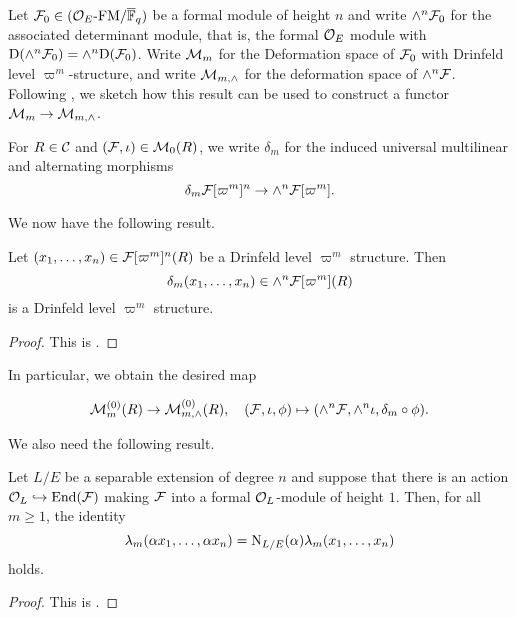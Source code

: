\documentclass[../main.tex]{subfiles}
\begin{document}
Let $\mathcal{F}_0 \in {({\mathcal{O}_E}\text-\allowbreak\mathrm{FM}/{{\overline{\mathbb{F}}_q}})}$ be a formal module of height $n$ and 
write $\wedge^n\mathcal{F}_0$ for the associated determinant module, that is, the 
formal $\mathcal{O}_E$ module with $\mathrm{D}(\wedge^n\mathcal{F}_0) = \wedge^n\mathrm{D}(\mathcal{F}_0)$. Write
$\mathcal{M}_m$ for the Deformation space of $\mathcal{F}_0$ with Drinfeld level
$\varpi^m$-structure, and write $\mathcal{M}_{m, \wedge}$ for the deformation space of
$\wedge^n\mathcal{F}$. 
Following \cite{weinstein2016semistable}, we sketch how this result can be
used to construct a functor $\mathcal{M}_{m} \to \mathcal{M}_{m, \wedge}$. 

For $R\in\mathcal{C}$ and $(\mathcal{F}, \iota) \in \mathcal{M}_{0}(R)$, we write $\delta_m$ for the
induced universal multilinear and alternating morphisms
\begin{equation*}
  \delta_m \mathcal{F}[\varpi^m]^n \to \wedge^n\mathcal{F}[\varpi^m].
\end{equation*}

We now have the following result.

\begin{lem}\label{lem:DeterminantOfDrinfeldStructure}
  Let $(x_1, \dots, x_n) \in \mathcal{F}[\varpi^{m}]^n(R)$ be a Drinfeld level
  $\varpi^m$ structure. Then 
  \begin{equation*}
    \delta_m(x_1, \dots, x_n) \in \wedge^n\mathcal{F}[\varpi^m](R) 
  \end{equation*}
  is a Drinfeld level $\varpi^m$ structure.
\begin{proof}
  This is \cite[Proposition 2.11]{weinstein2016semistable}.
\end{proof}
\end{lem}

In particular, we obtain the desired map

\begin{equation*}
  \mathcal{M}_m^{(0)}(R) \to \mathcal{M}^{(0)}_{m, \wedge}(R), \quad (\mathcal{F}, \iota, \phi)
  \mapsto (\wedge^n \mathcal{F}, \wedge^n \iota, \delta_m \circ \phi).
\end{equation*}

We also need the following result.

\begin{lem}\label{lem:WeinsteinDeterminantAndNorm}
  Let $L/E$ be a separable extension of degree $n$ and suppose that there 
  is an action $\mathcal{O}_L \hookrightarrow \operatorname{End}(\mathcal{F})$ making $\mathcal{F}$ into a formal $\mathcal{O}_L$-module
  of height $1$. Then, for all $m \geq 1$, the identity
  \begin{equation*}
    \lambda_m(\alpha x_1, \dots, \alpha x_n) = \mathrm{N}_{L/E}(\alpha) \lambda_m
    (x_1, \dots, x_n)
  \end{equation*}
  holds. 
  \begin{proof}
    This is \cite[Lemma 2.12]{weinstein2016semistable}.
  \end{proof}
\end{lem}
\end{document}
